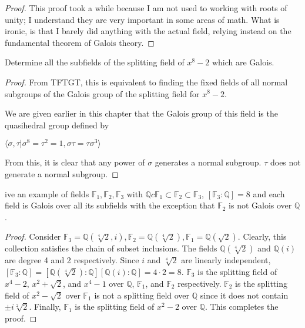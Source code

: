 \documentclass[10pt]{article}
\newcommand{\Q}{\mathbb{Q}}
\newenvironment{problem}[2][Problem]{\begin{trivlist}
		\item[\hskip \labelsep {\bfseries #1}\hskip \labelsep {\bfseries #2.}]}{\end{trivlist}}
\begin{document}
\begin{problem}{2.5}
\begin{proof}
			\rem
			This proof took a while because I am not used to working with roots of unity; I understand they are very important in some areas of math. What is ironic, is that I barely did anything with the actual field, relying instead on the fundamental theorem of Galois theory.
		\end{proof} 
	\end{problem}
	
	\begin{problem}{2.7}
		Determine all the subfields of the splitting field of $x^8 - 2$ which are Galois.
		\begin{proof}
			From TFTGT, this is equivalent to finding the fixed fields of all normal subgroups of the Galois group of the splitting field for $x^8-2$. 
			
			We are given earlier in this chapter that the Galois group of this field is the quasihedral group defined by
			\begin{center}
				$\langle \sigma, \tau | \sigma^8 = \tau^2 = 1, \sigma\tau = \tau\sigma^3 \rangle$
			\end{center}
			From this, it is clear that any power of $\sigma$ generates a normal subgroup. $\tau$ does not generate a normal subgroup.
		\end{proof}
	\end{problem}
	
	\begin{problem}
		Give an example of fields $\mathbb{F}_1, \mathbb{F}_2, \mathbb{F}_3$ with $\Q c \mathbb{F}_1 \subset \mathbb{F}_2 \subset \mathbb{F}_3$, $[\mathbb{F}_3 : \Q] = 8$ and each field is Galois over all its subfields with the exception that $\mathbb{F}_2$ is not Galois over $\Q$.
		\begin{proof}
			Consider $\mathbb{F}_3 = \Q(\sqrt[4]{2}, i), \mathbb{F}_2 = \Q(\sqrt[4]{2}), \mathbb{F}_1 = \Q(\sqrt{2})$. Clearly, this collection satisfies the chain of subset inclusions. The fields $\Q(\sqrt[4]{2})$ and $\Q(i)$ are degree 4 and 2 respectively. Since $i$ and $\sqrt[4]{2}$ are linearly independent, $[\mathbb{F}_3:\Q] = [\Q(\sqrt[4]{2}):\Q][\Q(i):\Q] = 4\cdot2 = 8$. $\mathbb{F}_3$ is the splitting field of $x^4-2$, $x^2 + \sqrt{2}$, and $x^4 - 1$ over $\Q$, $\mathbb{F}_1$, and $\mathbb{F}_2$ respectively. $\mathbb{F}_2$ is the splitting field of $x^2-\sqrt{2}$ over $\mathbb{F}_1$ is not a splitting field over $\Q$ since it does not contain $\pm i\sqrt[2]{2}$. Finally, $\mathbb{F}_1$ is the splitting field of $x^2-2$ over $\Q$. This completes the proof.
		\end{proof}
	\end{problem}
\end{document}
